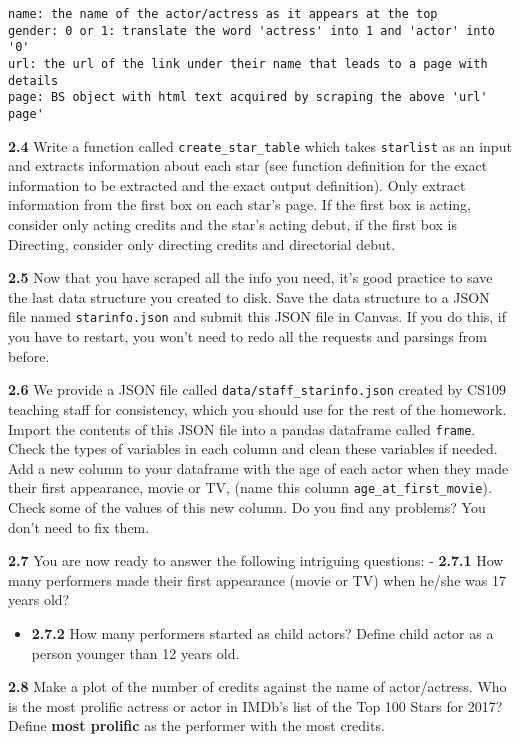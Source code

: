 \documentclass[11pt]{article}
\providecommand{\tightlist}{%
      \setlength{\itemsep}{0pt}\setlength{\parskip}{0pt}}
\begin{document}
\begin{verbatim}
name: the name of the actor/actress as it appears at the top
gender: 0 or 1: translate the word 'actress' into 1 and 'actor' into '0'
url: the url of the link under their name that leads to a page with details
page: BS object with html text acquired by scraping the above 'url' page' 
\end{verbatim}

\textbf{2.4} Write a function called \texttt{create\_star\_table} which
takes \texttt{starlist} as an input and extracts information about each
star (see function definition for the exact information to be extracted
and the exact output definition). Only extract information from the
first box on each star's page. If the first box is acting, consider only
acting credits and the star's acting debut, if the first box is
Directing, consider only directing credits and directorial debut.

\textbf{2.5} Now that you have scraped all the info you need, it's good
practice to save the last data structure you created to disk. Save the
data structure to a JSON file named \texttt{starinfo.json} and submit
this JSON file in Canvas. If you do this, if you have to restart, you
won't need to redo all the requests and parsings from before.

\textbf{2.6} We provide a JSON file called
\texttt{data/staff\_starinfo.json} created by CS109 teaching staff for
consistency, which you should use for the rest of the homework. Import
the contents of this JSON file into a pandas dataframe called
\texttt{frame}. Check the types of variables in each column and clean
these variables if needed. Add a new column to your dataframe with the
age of each actor when they made their first appearance, movie or TV,
(name this column \texttt{age\_at\_first\_movie}). Check some of the
values of this new column. Do you find any problems? You don't need to
fix them.

\textbf{2.7} You are now ready to answer the following intriguing
questions: - \textbf{2.7.1} How many performers made their first
appearance (movie or TV) when he/she was 17 years old?

\begin{itemize}
\tightlist
\item
  \textbf{2.7.2} How many performers started as child actors? Define
  child actor as a person younger than 12 years old.
\end{itemize}

\textbf{2.8} Make a plot of the number of credits against the name of
actor/actress. Who is the most prolific actress or actor in IMDb's list
of the Top 100 Stars for 2017? Define \textbf{most prolific} as the
performer with the most credits.
\end{document}
